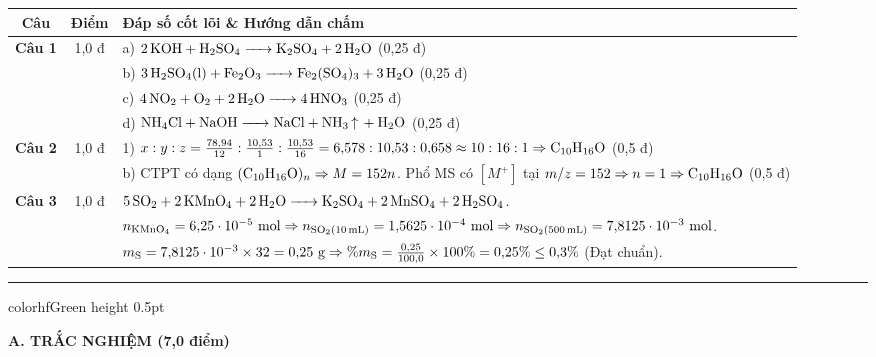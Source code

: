 \documentclass[11pt,a4paper]{article}
\begin{document}
\vspace{2pt}
\begin{center}
\renewcommand{\arraystretch}{1.2}
\begin{tabular}{|c|c|p{13.2cm}|}
\hline
\rowcolor{tableGreen}
\textbf{Câu} & \textbf{Điểm} & \textbf{Đáp số cốt lõi \& Hướng dẫn chấm} \\ \hline
\textbf{Câu 1} & 1,0 đ & a) $\ce{2KOH + H2SO4 -> K2SO4 + 2H2O}$ (0,25 đ)\\
& & b) $\ce{3H2SO4(l) + Fe2O3 -> Fe2(SO4)3 + 3H2O}$ (0,25 đ)\\
& & c) $\ce{4NO2 + O2 + 2H2O -> 4HNO3}$ (0,25 đ)\\
& & d) $\ce{NH4Cl + NaOH -> NaCl + NH3 ^ + H2O}$ (0,25 đ) \\ \hline
\textbf{Câu 2} & 1,0 đ & 1) $x : y : z = \frac{78{,}94}{12} : \frac{10{,}53}{1} : \frac{10{,}53}{16} = 6{,}578 : 10{,}53 : 0{,}658 \approx 10 : 16 : 1 \Rightarrow \ce{C10H16O}$ (0,5 đ)\\
& & b) CTPT có dạng $(\ce{C10H16O})_n \Rightarrow M = 152n$. Phổ MS có $[M^+]$ tại $m/z = 152 \Rightarrow n = 1 \Rightarrow \ce{C10H16O}$ (0,5 đ) \\ \hline
\textbf{Câu 3} & 1,0 đ & $\ce{5SO2 + 2KMnO4 + 2H2O -> K2SO4 + 2MnSO4 + 2H2SO4}$.\\
& & $n_{\ce{KMnO4}} = 6{,}25\cdot 10^{-5}\text{ mol} \Rightarrow n_{\ce{SO2(10 mL)}} = 1{,}5625\cdot 10^{-4}\text{ mol} \Rightarrow n_{\ce{SO2(500 mL)}} = 7{,}8125\cdot 10^{-3}\text{ mol}$.\\
& & $m_{\ce{S}} = 7{,}8125\cdot 10^{-3} \times 32 = 0{,}25\text{ g} \Rightarrow \%m_{\ce{S}} = \frac{0{,}25}{100{,}0}\times 100\% = 0{,}25\% \le 0{,}3\%$ (Đạt chuẩn). \\ \hline
\end{tabular}
\end{center}

\vspace{4pt}
\hrule color{hfGreen} height 0.5pt

\vspace{6pt}
{\large\bfseries\color{mainGreen} A. TRẮC NGHIỆM (7,0 điểm)}
\end{document}

